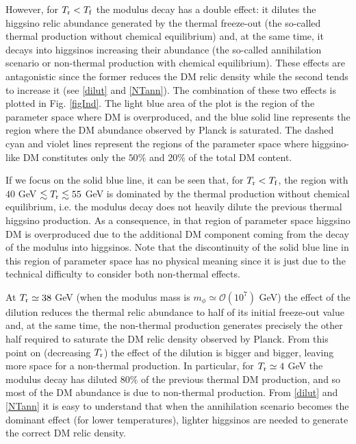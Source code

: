 \documentclass[11pt,a4paper]{article}
\newcommand{\mc}{\mathcal}
\begin{document}
However, for $T_{\rm r} < T_{\rm f}$ the modulus decay has a double effect: it dilutes the higgsino relic abundance generated by the thermal freeze-out (the so-called thermal production without chemical equilibrium) and, at the same time, it decays into higgsinos increasing their abundance (the so-called annihilation scenario or non-thermal production with chemical equilibrium). These effects are antagonistic since the former reduces the DM relic density while the second tends to increase it (see \eqref{dilut} and \eqref{NTann}). The combination of these two effects is plotted in Fig. \ref{figInd}. The light blue area of the plot is the region of the parameter space where DM is overproduced, and the blue solid line represents the region where the DM abundance observed by Planck is saturated. The dashed cyan and violet lines represent the regions of the parameter space where higgsino-like DM constitutes only the $50\%$ and $20\%$ of the total DM content. 

If we focus on the solid blue line, it can be seen that, for $T_{\rm r} < T_{\rm f}$, the region with $40$ GeV $\lesssim T_{\rm r} \lesssim 55$ GeV is dominated by the thermal production without chemical equilibrium, i.e. the modulus decay does not heavily dilute the previous thermal higgsino production. As a consequence, in that region of parameter space higgsino DM is overproduced due to the additional DM component coming from the decay of the modulus into higgsinos. Note that the discontinuity of the solid blue line in this region of parameter space has no physical meaning since it is just due to the technical difficulty to consider both non-thermal effects.

At $T_{\rm r} \simeq 38$ GeV (when the modulus mass is $m_\phi \simeq \mc{O} (10^7) $ GeV) the effect of the dilution reduces the thermal relic abundance to half of its initial freeze-out value and, at the same time, the non-thermal production generates precisely the other half required to saturate the DM relic density observed by Planck. From this point on (decreasing $T_{\rm r}$) the effect of the dilution is bigger and bigger, leaving more space for a non-thermal production. In particular, for $T_{\rm r} \simeq 4$ GeV the modulus decay has diluted $80\%$ of the previous thermal DM production, and so most of the DM abundance is due to non-thermal production. From \eqref{dilut} and \eqref{NTann} it is easy to understand that when the annihilation scenario becomes the dominant effect (for lower temperatures), lighter higgsinos are needed to generate the correct DM relic density.
\end{document}
